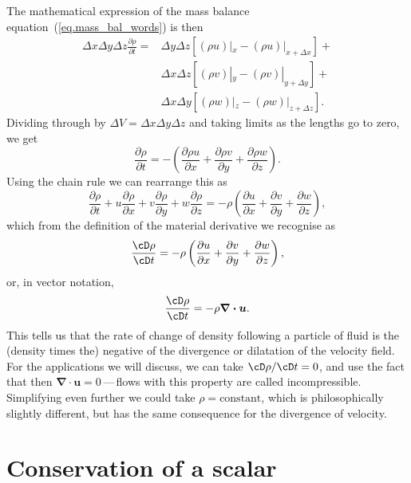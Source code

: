 \documentclass[twoside,11pt]		{report}
\begin{document}
The mathematical expression of the mass balance
equation~(\ref{eq.mass_bal_words}) is then 
\begin{equation}
\begin{split}
\Delta x\Delta y\Delta z\frac{\partial \rho}{\partial t}=&
  \Delta y\Delta z[(\rho u)|_{x}-(\rho u)|_{x+\Delta x}]+\\
& \Delta x\Delta z[(\rho v)|_{y}-(\rho v)|_{y+\Delta y}]+\\
& \Delta x\Delta y[(\rho w)|_{z}-(\rho w)|_{z+\Delta z}].
\end{split}
\end{equation}
Dividing through by $\Delta V=\Delta x\Delta y\Delta z$ and taking
limits as the lengths go to zero, we get
\begin{equation}
\frac{\partial \rho}{\partial t}=-\left(
\frac{\partial \rho u}{\partial x} +
\frac{\partial \rho v}{\partial y} +
\frac{\partial \rho w}{\partial z}\right).
\end{equation}
Using the chain rule we can rearrange this as
\begin{equation}
\frac{\partial \rho}{\partial t} + u\frac{\partial\rho}{\partial x} +
v\frac{\partial\rho}{\partial y}+w\frac{\partial\rho}{\partial z}=-\rho\left(
\frac{\partial u}{\partial x} +
\frac{\partial v}{\partial y} +
\frac{\partial w}{\partial z}\right),
\label{eq.contin}
\end{equation}
which from the definition of the material derivative we recognise as 
\begin{equation}
\frac{\cD \rho}{\cD t} =-\rho\left(
\frac{\partial u}{\partial x} +
\frac{\partial v}{\partial y} +
\frac{\partial w}{\partial z}\right),
\end{equation}
or, in vector notation,
\begin{equation}
\frac{\cD \rho}{\cD t} =-\rho\bm{\nabla\cdot u}.
\end{equation}
This tells us that the rate of change of density following a particle
of fluid is the (density times the) negative of the divergence or
dilatation of the velocity field. For the applications we will
discuss, we can take $\cD\rho/\cD t=0$, and use the fact that then
$\bm{\nabla\cdot u}=0$\,---\,flows with this property are called
incompressible. Simplifying even further we could take
$\rho=\textrm{constant}$, which is philosophically slightly different,
but has the same consequence for the divergence of velocity.

\section{Conservation of a scalar}
\end{document}
